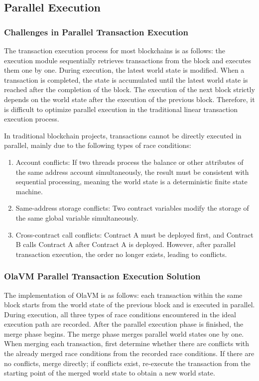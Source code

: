 \subsection{Parallel Execution}\label{section: parallel-execution}

\subsubsection{Challenges in Parallel Transaction Execution}

The transaction execution process for most blockchains is as follows: the execution module sequentially retrieves transactions from the block and executes them one by one. During execution, the latest world state is modified. When a transaction is completed, the state is accumulated until the latest world state is reached after the completion of the block. The execution of the next block strictly depends on the world state after the execution of the previous block. Therefore, it is difficult to optimize parallel execution in the traditional linear transaction execution process.

In traditional blockchain projects, transactions cannot be directly executed in parallel, mainly due to the following types of race conditions:

\begin{enumerate}
    \item Account conflicts: If two threads process the balance or other attributes of the same address account simultaneously, the result must be consistent with sequential processing, meaning the world state is a deterministic finite state machine.
    \item Same-address storage conflicts: Two contract variables modify the storage of the same global variable simultaneously.
    \item Cross-contract call conflicts: Contract A must be deployed first, and Contract B calls Contract A after Contract A is deployed. However, after parallel transaction execution, the order no longer exists, leading to conflicts.
\end{enumerate}

\subsubsection{OlaVM Parallel Transaction Execution Solution}

The implementation of OlaVM is as follows: each transaction within the same block starts from the world state of the previous block and is executed in parallel. During execution, all three types of race conditions encountered in the ideal execution path are recorded. After the parallel execution phase is finished, the merge phase begins. The merge phase merges parallel world states one by one. When merging each transaction, first determine whether there are conflicts with the already merged race conditions from the recorded race conditions. If there are no conflicts, merge directly; if conflicts exist, re-execute the transaction from the starting point of the merged world state to obtain a new world state.

